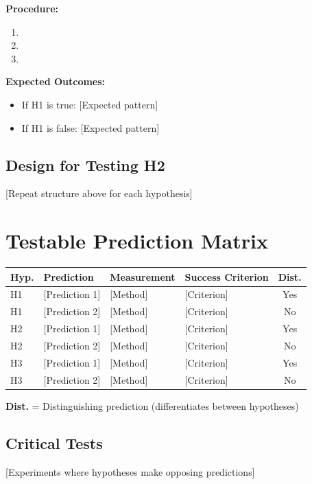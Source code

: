 \documentclass[11pt,a4paper]{article}
\begin{document}
\textbf{Procedure:}
\begin{enumerate}
    \item [Step 1]
    \item [Step 2]
    \item [Step 3]
\end{enumerate}

\textbf{Expected Outcomes:}
\begin{itemize}
    \item If H1 is true: [Expected pattern]
    \item If H1 is false: [Expected pattern]
\end{itemize}

\subsection*{Design for Testing H2}
[Repeat structure above for each hypothesis]

\newpage

\section{Testable Prediction Matrix}

\begin{center}
\footnotesize
\begin{tabularx}{\textwidth}{lXXXc}
\toprule
\textbf{Hyp.} & \textbf{Prediction} & \textbf{Measurement} & \textbf{Success Criterion} & \textbf{Dist.} \\
\midrule
H1 & [Prediction 1] & [Method] & [Criterion] & Yes \\
H1 & [Prediction 2] & [Method] & [Criterion] & No \\
H2 & [Prediction 1] & [Method] & [Criterion] & Yes \\
H2 & [Prediction 2] & [Method] & [Criterion] & No \\
H3 & [Prediction 1] & [Method] & [Criterion] & Yes \\
H3 & [Prediction 2] & [Method] & [Criterion] & No \\
\bottomrule
\end{tabularx}
\end{center}

\noindent \textbf{Dist.} = Distinguishing prediction (differentiates between hypotheses)

\subsection*{Critical Tests}
[Experiments where hypotheses make opposing predictions]
\end{document}
